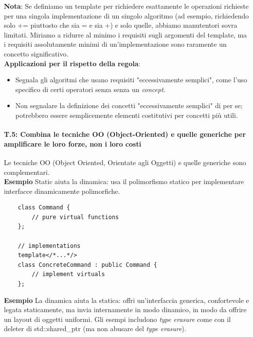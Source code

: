 \textsf{\small \textbf{Nota}: Se definiamo un template per richiedere esattamente le operazioni richieste per una singola implementazione di un singolo algoritmo (ad esempio, richiedendo solo += piuttosto che sia = e sia +) e solo quelle, abbiamo manutentori sovra limitati. Miriamo a ridurre al minimo i requisiti sugli argomenti del template, ma i requisiti assolutamente minimi di un'implementazione sono raramente un concetto significativo.} \\

\textsf{\small \textbf{Applicazioni per il rispetto della regola}: }

\begin{itemize}
	\item \textsf{\small Segnala gli algoritmi che usano requisiti "eccessivamente semplici", come l'uso specifico di certi operatori senza senza un \emph{concept}.}
	\item \textsf{\small Non segnalare la definizione dei concetti "eccessivamente semplici" di per se; potrebbero essere semplicemente elementi costitutivi per concetti più utili.}
\end{itemize}

\paragraph{T.5: Combina le tecniche OO (Object-Oriented) e quelle generiche per amplificare le loro forze, non i loro costi}

\textsf{\small Le tecniche OO (Object Oriented, Orientate agli Oggetti) e quelle generiche sono complementari. } \\

\textsf{\small \textbf{Esempio} Static aiuta la dinamica: usa il polimorfismo statico per implementare interfacce dinamicamente polimorfiche.} \\

\begin{lstlisting}
	class Command {
		// pure virtual functions
	};
	
	// implementations
	template</*...*/>
	class ConcreteCommand : public Command {
		// implement virtuals
	};
\end{lstlisting}

\textsf{\small \textbf{Esempio} La dinamica aiuta la statica: offri un'interfaccia generica, confortevole e legata staticamente, ma invia internamente in modo dinamico, in modo da offrire un layout di oggetti uniformi. Gli esempi includono \emph{type erasure} come con il deleter di std::shared\_ptr (ma non abusare del \emph{type erasure}).} \\

